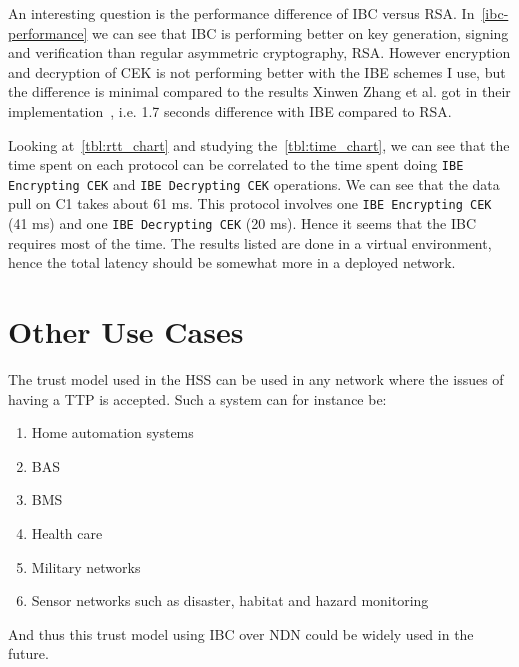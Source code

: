 An interesting question is the performance difference of \gls{IBC} versus RSA.
In~\autoref{ibc-performance} we can see that \gls{IBC} is performing better on key generation, signing and verification than regular asymmetric cryptography, RSA. 
However encryption and decryption of \gls{CEK} is not performing better with the \gls{IBE} schemes I use, but the difference is minimal compared to the results Xinwen Zhang et al. got in their implementation~\cite{DBLP:conf/icnp/ZhangCXWSW11}, i.e. 1.7 seconds difference with \gls{IBE} compared to RSA.

Looking at~\autoref{tbl:rtt_chart} and studying the~\autoref{tbl:time_chart}, we can see that the time spent on each protocol can be correlated to the time spent doing \texttt{IBE Encrypting \gls{CEK}} and \texttt{IBE Decrypting \gls{CEK}} operations. 
We can see that the data pull on C1 takes about 61 ms.
This protocol involves one \texttt{IBE Encrypting \gls{CEK}} (41 ms) and one \texttt{IBE Decrypting \gls{CEK}} (20 ms). 
Hence it seems that the \gls{IBC} requires most of the time.
The results listed are done in a virtual environment, hence the total latency should be somewhat more in a deployed network.

\section{Other Use Cases}
The trust model used in the \gls{HSS} can be used in any network where the issues of having a \gls{TTP} is accepted. 
Such a system can for instance be:
\begin{enumerate}
	\item Home automation systems
	\item \gls{BAS}
	\item \gls{BMS}
	\item Health care
	\item Military networks
	\item Sensor networks such as disaster, habitat and hazard monitoring
\end{enumerate}

And thus this trust model using \gls{IBC} over \gls{NDN} could be widely used in the future.
